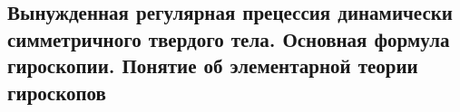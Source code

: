 

\subsection{Вынужденная регулярная прецессия динамически симметричного твердого тела. Основная формула гироскопии. Понятие об элементарной теории гироскопов}



